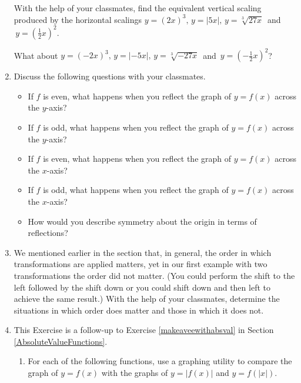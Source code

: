 \begin{enumerate}
With the help of your classmates, find the equivalent vertical scaling produced by the horizontal scalings $y = (2x)^{3}, \, y = |5x|, \, y = \sqrt[3]{27x} \, $ and $\, y = \left(\frac{1}{2} x\right)^{2}$.  

What about $y = (-2x)^{3}, \, y = |-5x|, \, y = \sqrt[3]{-27x}\, $ and $\, y = \left(-\frac{1}{2} x\right)^{2}$?

\item   \label{SymmetryandReflectionsExercise}  Discuss the following questions with your classmates.

\begin{itemize}
\item If $f$ is even, what happens when you reflect the graph of $y = f(x)$ across the $y$-axis? 
\item If $f$ is odd, what happens when you reflect the graph of $y = f(x)$ across the $y$-axis? 
\item  If $f$ is even, what happens when you reflect the graph of $y = f(x)$ across the $x$-axis? 
\item  If $f$ is odd, what happens when you reflect the graph of $y = f(x)$ across the $x$-axis?  
\item How would you describe symmetry about the origin in terms of reflections?
\end{itemize}

\item  We mentioned earlier in the section that, in general, the order in which transformations are applied matters, yet in our first example with two transformations the order did not matter. (You could perform the shift to the left followed by the shift down or you could shift down and then left to achieve the same result.)  With the help of your classmates, determine the situations in which order does matter and those in which it does not.

\item \label{relatedbyabsexercise}  This Exercise is a follow-up to Exercise \ref{makeaveewithabsval} in Section \ref{AbsoluteValueFunctions}.

\begin{enumerate}

\item For each of the following functions, use a graphing utility to compare the graph of $y = f(x)$ with the graphs of $y = |f(x)|$ and $y = f(|x|)$. 



\end{enumerate}
\end{enumerate}
